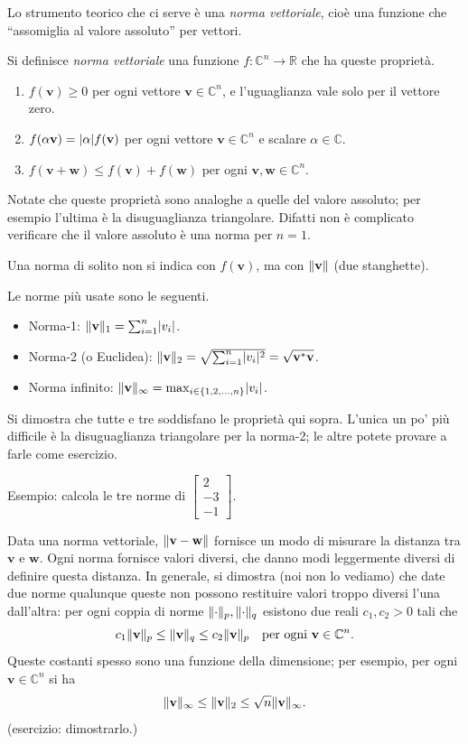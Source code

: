 \documentclass[a4paper]{report}
\DeclarePairedDelimiter{\abs}{\lvert}{\rvert}
\DeclarePairedDelimiter{\norm}{\lVert}{\rVert}
\theoremstyle{definition}
\theoremstyle{remark}
\begin{document}
Lo strumento teorico che ci serve è una \emph{norma vettoriale}, cioè una funzione che ``assomiglia al valore assoluto'' per vettori.

Si definisce \emph{norma vettoriale} una funzione $f: \mathbb{C}^n \to \mathbb{R}$ che ha queste proprietà.
\begin{enumerate}
    \item $f(\mathbf{v}) \geq 0$ per ogni vettore $\mathbf{v}\in\mathbb{C}^n$, e l'uguaglianza vale solo per il vettore zero.
    \item $f(\alpha \mathbf{v}) = \abs{\alpha} f(\mathbf{v})$ per ogni vettore $\mathbf{v}\in\mathbb{C}^n$ e scalare $\alpha \in \mathbb{C}$.
    \item $f(\mathbf{v}+\mathbf{w}) \leq f(\mathbf{v}) + f(\mathbf{w})$ per ogni $\mathbf{v},\mathbf{w}\in\mathbb{C}^n$.
\end{enumerate}
Notate che queste proprietà sono analoghe a quelle del valore assoluto; per esempio l'ultima è la disuguaglianza triangolare. Difatti non è complicato verificare che il valore assoluto è una norma per $n=1$.

Una norma di solito non si indica con $f(\mathbf{v})$, ma con $\norm{\mathbf{v}}$ (due stanghette).

Le norme più usate sono le seguenti.

\begin{itemize}
    \item Norma-1: $\norm{\mathbf{v}}_1 = \sum_{i=1}^n \abs{v_i}$.
    \item Norma-2 (o Euclidea): $\norm{\mathbf{v}}_2 = \sqrt{\sum_{i=1}^n \abs{v_i}^2} = \sqrt{\mathbf{v}^*\mathbf{v}}$.
    \item Norma infinito: $\norm{\mathbf{v}}_\infty = \max_{i\in \{1,2,\dots,n\}} \abs{v_i}$.
\end{itemize}
Si dimostra che tutte e tre soddisfano le proprietà qui sopra. L'unica un po' più difficile è la disuguaglianza triangolare per la norma-2; le altre potete provare a farle come esercizio.

Esempio: calcola le tre norme di $\begin{bmatrix}
    2\\-3\\-1
\end{bmatrix}$.

Data una norma vettoriale, $\norm{\mathbf{v}-\mathbf{w}}$ fornisce un modo di misurare la distanza tra $\mathbf{v}$ e $\mathbf{w}$. Ogni norma fornisce valori diversi, che danno modi leggermente diversi di definire questa distanza. In generale, si dimostra (noi non lo vediamo) che date due norme qualunque queste non possono restituire valori troppo diversi l'una dall'altra: per ogni coppia di norme $\norm{\cdot}_p,\norm{\cdot}_q$ esistono due reali $c_1,c_2 > 0$ tali che
\[
c_1\norm{\mathbf{v}}_p \leq \norm{\mathbf{v}}_q \leq c_2 \norm{\mathbf{v}}_p \quad \text{per ogni $\mathbf{v}\in\mathbb{C}^n$}.
\]
Queste costanti spesso sono una funzione della dimensione; per esempio, per ogni $\mathbf{v}\in\mathbb{C}^n$ si ha
\[
\norm{\mathbf{v}}_\infty \leq \norm{\mathbf{v}}_2 \leq \sqrt{n}\norm{\mathbf{v}}_\infty.
\]
(esercizio: dimostrarlo.)
\end{document}
